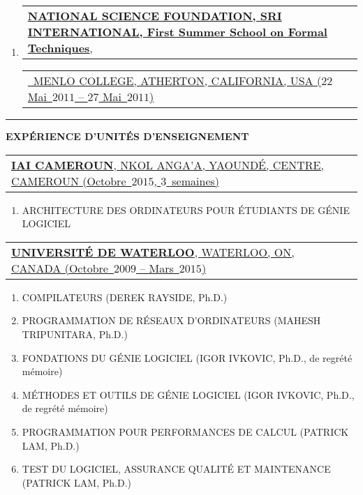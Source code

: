 \documentclass[9pt,a4paper]{article} %
\makeatletter
\newcommand{\headerrow}[2]
{\begin{tabular*}{\linewidth}{l@{\extracolsep{\fill}}r}
	#1 &
	#2 \\
\end{tabular*}}
\newcommand{\headerrowONE}[1]{\headerrow{#1}{}}
\newcommand{\cvitemdate}[2]{#1~$#2$\xspace}
\makeatother
\begin{document}
\vspace{0.5em}

\begin{enumerate}
	\item \headerrowONE{\href{http://fm.csl.sri.com/SSFT11/}{\textbf{NATIONAL SCIENCE FOUNDATION, SRI INTERNATIONAL, First Summer School on Formal Techniques},}}
			\headerrowONE{\href{http://fm.csl.sri.com/SSFT11}{\ \hfill  MENLO COLLEGE, ATHERTON, 
			CALIFORNIA, USA (\cvitemdate{$22$ Mai}{2011} -- \cvitemdate{$27$ Mai}{2011})}}

\end{enumerate}

\vspace{1em}


\hrule
\begin{center}
{\large \textbf{EXPÉRIENCE D'UNITÉS D'ENSEIGNEMENT}}
\end{center}

\vspace{0.5em}

\headerrowONE{\href{http://iaicameroun.com}{\textbf{IAI CAMEROUN}, NKOL ANGA'A, YAOUNDÉ, CENTRE, CAMEROUN (Octobre~$2015$, $3$~semaines)}}
\begin{enumerate}
	\item ARCHITECTURE DES ORDINATEURS POUR ÉTUDIANTS DE GÉNIE LOGICIEL
\end{enumerate}

\vspace{0.5em}

\headerrowONE{\href{http://ece.uwaterloo.ca}{\textbf{UNIVERSITÉ DE WATERLOO}, WATERLOO, ON, CANADA (Octobre~$2009$ -- Mars~$2015$)}}

\begin{enumerate}
	\itemsep -0.3em
	\item COMPILATEURS (DEREK RAYSIDE, Ph.D.)
	\item PROGRAMMATION DE RÉSEAUX D'ORDINATEURS (MAHESH TRIPUNITARA, Ph.D.)
	\item FONDATIONS DU GÉNIE LOGICIEL (IGOR IVKOVIC, Ph.D., de regrété mémoire)
	\item MÉTHODES ET OUTILS DE GÉNIE LOGICIEL (IGOR IVKOVIC, Ph.D., de regrété mémoire)
	\item PROGRAMMATION POUR PERFORMANCES DE CALCUL (PATRICK LAM, Ph.D.)
	\item TEST DU LOGICIEL, ASSURANCE QUALITÉ ET MAINTENANCE (PATRICK LAM, Ph.D.)
\end{enumerate}
\end{document}
